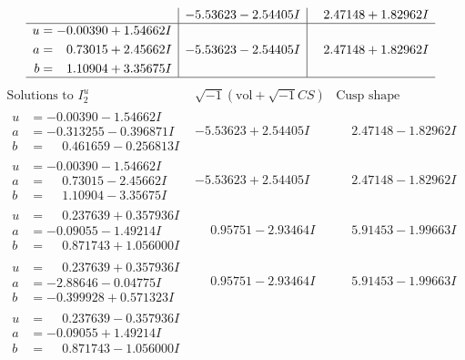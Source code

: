 \documentclass[1p]{elsarticle_modified}
\theoremstyle{definition}
\newcommand{\I}{\sqrt{-1}}
\begin{document}
$$\begin{array}{c|c|c}
 & -5.53623 - 2.54405 I & \phantom{-}2.47148 + 1.82962 I \\ \hline\begin{aligned}
u &= -0.00390 + 1.54662 I \\
a &= \phantom{-}0.73015 + 2.45662 I \\
b &= \phantom{-}1.10904 + 3.35675 I\end{aligned}
 & -5.53623 - 2.54405 I & \phantom{-}2.47148 + 1.82962 I\\
 \hline 
 \end{array}$$\newpage$$\begin{array}{c|c|c}  
\text{Solutions to }I^u_{2}& \I (\text{vol} + \sqrt{-1}CS) & \text{Cusp shape}\\
 \hline 
\begin{aligned}
u &= -0.00390 - 1.54662 I \\
a &= -0.313255 - 0.396871 I \\
b &= \phantom{-}0.461659 - 0.256813 I\end{aligned}
 & -5.53623 + 2.54405 I & \phantom{-}2.47148 - 1.82962 I \\ \hline\begin{aligned}
u &= -0.00390 - 1.54662 I \\
a &= \phantom{-}0.73015 - 2.45662 I \\
b &= \phantom{-}1.10904 - 3.35675 I\end{aligned}
 & -5.53623 + 2.54405 I & \phantom{-}2.47148 - 1.82962 I \\ \hline\begin{aligned}
u &= \phantom{-}0.237639 + 0.357936 I \\
a &= -0.09055 - 1.49214 I \\
b &= \phantom{-}0.871743 + 1.056000 I\end{aligned}
 & \phantom{-}0.95751 - 2.93464 I & \phantom{-}5.91453 - 1.99663 I \\ \hline\begin{aligned}
u &= \phantom{-}0.237639 + 0.357936 I \\
a &= -2.88646 - 0.04775 I \\
b &= -0.399928 + 0.571323 I\end{aligned}
 & \phantom{-}0.95751 - 2.93464 I & \phantom{-}5.91453 - 1.99663 I \\ \hline\begin{aligned}
u &= \phantom{-}0.237639 - 0.357936 I \\
a &= -0.09055 + 1.49214 I \\
b &= \phantom{-}0.871743 - 1.056000 I\end{aligned}

\end{array}$$
\end{document}
